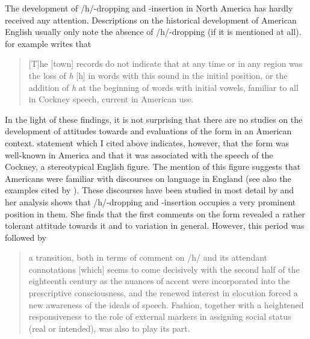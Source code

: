 The development of /h/-dropping and -insertion in North America has hardly received any attention. Descriptions on the historical development of American English usually only note the absence of /h/-dropping (if it is mentioned at all). \citet[206]{Krapp19252} for example writes that

\begin{quote}
[T]he [town] records do not indicate that at any time or in any region was the loss of \emph{h} [h] in words with this sound in the initial position, or the addition of \emph{h} at the beginning of words with initial vowels, familiar to all in Cockney speech, current in American use.
\end{quote}

In the light of these findings, it is not surprising that there are no studies on the development of attitudes towards and evaluations of the form in an American context.  statement which I cited above indicates, however, that the form was well-known in America and that it was associated with the speech of the Cockney, a stereotypical English figure. The mention of this figure suggests that Americans were familiar with discourses on language in England (see also the examples cited by \citealt[131]{Bailey1996}). These discourses have been studied in most detail by \citet{Mugglestone2003} and her analysis shows that /h/-dropping and -insertion occupies a very prominent position in them. She finds that the first comments on the form revealed a rather tolerant attitude towards it and to variation in general. However, this period was followed by

\begin{quote}
a transition, both in terms of comment on /h/ and its attendant connotations [which] seems to come decisively with the second half of the eighteenth century as the nuances of accent were incorporated into the prescriptive consciousness, and the renewed interest in elocution forced a new awareness of the ideals of speech. Fashion, together with a heightened responsiveness to the role of external markers in assigning social status (real or intended), was also to play its part. \citep[99]{Mugglestone2003}
\end{quote}


